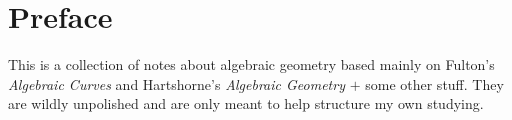 \section*{Preface}
This is a collection of notes about algebraic geometry based mainly on Fulton's \emph{Algebraic Curves} and Hartshorne's \emph{Algebraic Geometry} $+$ some other stuff. They are wildly unpolished and are only meant to help structure my own studying. 